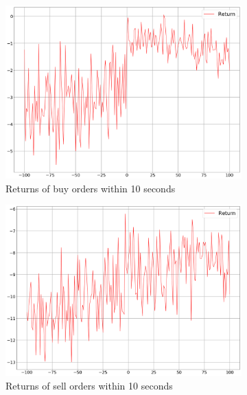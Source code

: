 \begin{figure}
    \centering
    \begin{subfigure}[b]{0.45\textwidth}
        \includegraphics[width=\textwidth]{images/behaviour-up-10s-buy.png}
        \caption{Returns of buy orders within 10 seconds}
        \label{fig:behvaiour-up-10s-buy}
    \end{subfigure}
    \begin{subfigure}[b]{0.45\textwidth}
        \includegraphics[width=\textwidth]{images/behaviour-up-10s-sell.png}
        \caption{Returns of sell orders within 10 seconds}
        \label{fig:behvaiour-up-10s-sell}
    \end{subfigure}
    \begin{subfigure}[b]{0.45\textwidth}

\end{subfigure}
\end{figure}
